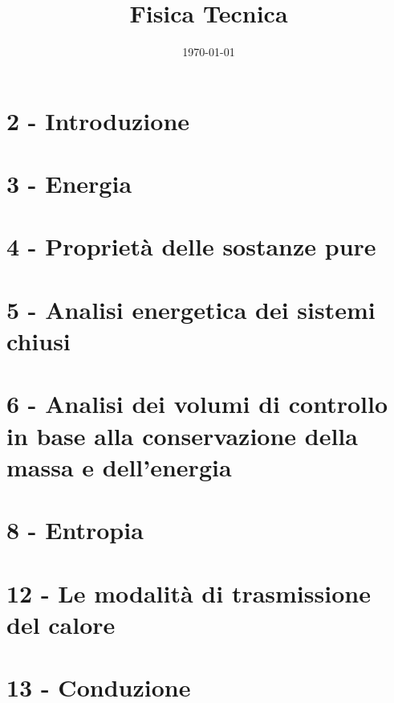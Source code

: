 \documentclass[11pt,a4paper]{book}
\title{Fisica Tecnica}
\author{}
\date{\today}
\begin{document}
\maketitle
\tableofcontents


\chapter{2 - Introduzione}


\chapter{3 - Energia}


\chapter{4 - Proprietà delle sostanze pure}


\chapter{5 - Analisi energetica dei sistemi chiusi}


\chapter{6 - Analisi dei volumi di controllo in base alla conservazione della massa e dell’energia}


\chapter{8 - Entropia}


\chapter{12 - Le modalità di trasmissione del calore}


\chapter{13 - Conduzione}

\end{document}
